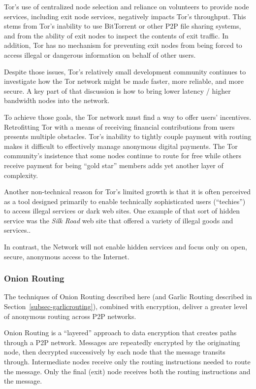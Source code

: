 Tor's use of centralized node selection and reliance on volunteers to provide node services, including exit node services, negatively impacts Tor's throughput. This stems from Tor's inability to use BitTorrent or other P2P file sharing systems, and from the ability of exit nodes to inspect the contents of exit traffic. In addition, Tor has no mechanism for preventing exit nodes from being forced to access illegal or dangerous information on behalf of other users.

Despite those issues, Tor's relatively small development community continues to investigate how the Tor network might be made faster, more reliable, and more secure\cite{25}. A key part of that discussion is how to bring lower latency / higher bandwidth nodes into the network\cite{20, 21, 22, 23, 24}.

To achieve those goals, the Tor network must find a way to offer users' incentives. Retrofitting Tor with a means of receiving financial contributions from users presents multiple obstacles. Tor's inability to tightly couple payment with routing makes it difficult to effectively manage anonymous digital payments. The Tor community's insistence that some nodes continue to route for free while others receive payment for being “gold star” members adds yet another layer of complexity.

Another non-technical reason for Tor’s limited growth is that it is often perceived as a tool designed primarily to enable technically sophisticated users (``techies'') to access illegal services or dark web sites. One example of that sort of hidden service was the \textit{Silk Road} web site that offered a variety of illegal goods and services.\cite{18,19}.

In contrast, the \orchid{} Network will not enable hidden services and focus only on open, secure, anonymous access to the Internet.

\subsubsection{Onion Routing}
\label{subsec-onionrouting}
The techniques of Onion Routing described here (and Garlic Routing described in Section~\ref{subsec-garlicrouting}), combined with encryption, deliver a greater level of anonymous routing across P2P networks.

Onion Routing is a ``layered'' approach to data encryption that creates paths through a P2P network. Messages are repeatedly encrypted by the originating node, then decrypted successively by each node that the message transits through. Intermediate nodes receive only the routing instructions needed to route the message. Only the final (exit) node receives both the routing instructions and the  message.

